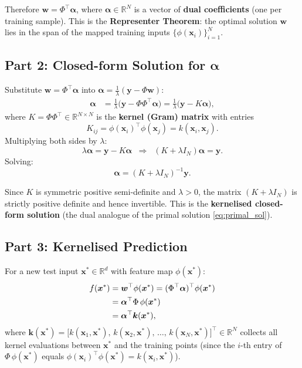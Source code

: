 \documentclass[12pt,a4paper]{article}
\newcommand{\R}{\mathbb{R}}
\newcommand{\bx}{\bm{x}}
\newcommand{\bw}{\bm{w}}
\newcommand{\by}{\bm{y}}
\newcommand{\ba}{\bm{\alpha}}
\begin{document}
Therefore $\bw = \Phi^\top\ba$, where $\ba \in \R^N$ is a vector of
\textbf{dual coefficients} (one per training sample).  This is the
\textbf{Representer Theorem}: the optimal solution $\bw$ lies in the span
of the mapped training inputs $\{\phi(\bx_i)\}_{i=1}^N$.

\subsection{Part 2: Closed-form Solution for \texorpdfstring{$\ba$}{alpha}}

Substitute $\bw = \Phi^\top\ba$ into $\ba = \frac{1}{\lambda}(\by - \Phi\bw)$:
\begin{align}
  \ba
  &= \frac{1}{\lambda}\bigl(\by - \Phi\Phi^\top\ba\bigr)
   = \frac{1}{\lambda}\bigl(\by - K\ba\bigr),
\end{align}
where $K = \Phi\Phi^\top \in \R^{N\times N}$ is the \textbf{kernel (Gram) matrix}
with entries
\[
  K_{ij} = \phi(\bx_i)^\top\phi(\bx_j) = k(\bx_i, \bx_j).
\]
Multiplying both sides by $\lambda$:
\begin{equation}
  \lambda\ba = \by - K\ba
  \;\;\Longrightarrow\;\;
  (K + \lambda I_N)\ba = \by.
\end{equation}
Solving:
\begin{equation}
  \boxed{
  \ba = (K + \lambda I_N)^{-1}\by.
  }
  \label{eq:alpha_sol}
\end{equation}

Since $K$ is symmetric positive semi-definite and $\lambda > 0$, the matrix
$(K + \lambda I_N)$ is strictly positive definite and hence invertible.
This is the \textbf{kernelised closed-form solution} (the dual analogue of
the primal solution \eqref{eq:primal_sol}).

\subsection{Part 3: Kernelised Prediction}

For a new test input $\bx^* \in \R^d$ with feature map $\phi(\bx^*)$:
\begin{align}
  f(\bx^*)
  &= \bw^\top\phi(\bx^*)
   = (\Phi^\top\ba)^\top\phi(\bx^*) \notag\\
  &= \ba^\top \Phi\,\phi(\bx^*) \notag\\
  &= \ba^\top \bm{k}(\bx^*),
\end{align}
where
$\bm{k}(\bx^*) = \bigl[k(\bx_1, \bx^*),\, k(\bx_2, \bx^*),\, \ldots,\,
k(\bx_N, \bx^*)\bigr]^\top \in \R^N$
collects all kernel evaluations between $\bx^*$ and the training points
(since the $i$-th entry of $\Phi\,\phi(\bx^*)$ equals $\phi(\bx_i)^\top\phi(\bx^*)=k(\bx_i,\bx^*)$).
\end{document}

